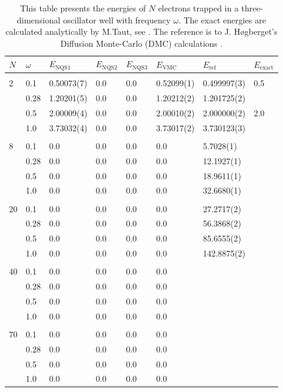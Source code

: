 \begin{table} [H]
	\caption{This table presents the energies of $N$ electrons trapped in a three-dimensional oscillator well with frequency $\omega$. The exact energies are calculated analytically by M.Taut, see \cite{taut_two_1993}. The reference is to J. Høgberget's Diffusion Monte-Carlo (DMC) calculations \cite{hogberget_quantum_2013}. } 
	\begin{tabularx}{\textwidth}{l:l|XXXXXX} \hline\hline
		\label{tab:quantumdotswinteraction3D}
		$N$ & $\omega$ & $E_{\text{NQS1}}$ & $E_{\text{NQS2}}$ & $E_{\text{NQS3}}$ & $E_{\text{VMC}}$ & $E_{\text{ref}} $ & $E_{\text{exact}}$ \\ \hline \\
		2 & 0.1 & 0.50073(7) & 0.0 & 0.0 & 0.52099(1) & 0.499997(3) & 0.5 \\
		& 0.28 & 1.20201(5) & 0.0 & 0.0 & 1.20212(2) & 1.201725(2) & \\
		& 0.5 & 2.00009(4) & 0.0 & 0.0 & 2.00010(2) & 2.000000(2) & 2.0 \\
		& 1.0 & 3.73032(4) & 0.0 & 0.0 & 3.73017(2) & 3.730123(3) &  \\ \hdashline \\
		
		8 & 0.1 & 0.0 & 0.0 & 0.0 & 0.0 & 5.7028(1) \\ 
		& 0.28 & 0.0 & 0.0 & 0.0 & 0.0 & 12.1927(1) \\
		& 0.5 & 0.0 & 0.0 & 0.0 & 0.0 & 18.9611(1) \\
		& 1.0 & 0.0 & 0.0 & 0.0 & 0.0 & 32.6680(1) \\ \hdashline \\
		
		20 & 0.1 & 0.0 & 0.0 & 0.0 & 0.0 & 27.2717(2) \\ 
		& 0.28 & 0.0 & 0.0 & 0.0 & 0.0 & 56.3868(2) \\
		& 0.5 & 0.0 & 0.0 & 0.0 & 0.0 & 85.6555(2) \\
		& 1.0 & 0.0 & 0.0 & 0.0 & 0.0 & 142.8875(2) \\ \hdashline \\
		
		40 & 0.1 & 0.0 & 0.0 & 0.0 & 0.0 \\ 
		& 0.28 & 0.0 & 0.0 & 0.0 & 0.0 \\
		& 0.5 & 0.0 & 0.0 & 0.0 & 0.0 \\
		& 1.0 & 0.0 & 0.0 & 0.0 & 0.0 \\ \hdashline \\
		
		70 & 0.1 & 0.0 & 0.0 & 0.0 & 0.0 \\ 
		& 0.28 & 0.0 & 0.0 & 0.0 & 0.0 \\
		& 0.5 & 0.0 & 0.0 & 0.0 & 0.0 \\
		& 1.0 & 0.0 & 0.0 & 0.0 & 0.0 \\ \hline\hline
	\end{tabularx}
\end{table}
